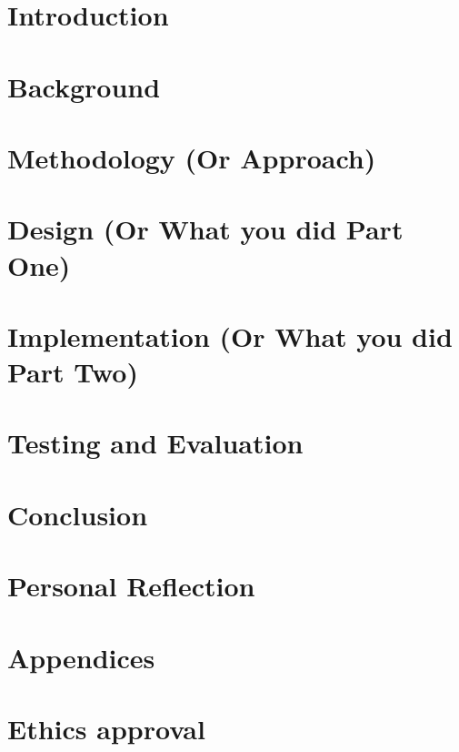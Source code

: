 \documentclass[12pt,twoside]{report}
\begin{document}






\tableofcontents

\listoffigures

\listoftables


\chapter{Introduction}


\chapter{Background}


\chapter{Methodology (Or Approach)}


\chapter{Design (Or What you did Part One)}


\chapter{Implementation (Or What you did Part Two)}


\chapter{Testing and Evaluation}


\chapter{Conclusion}



\appendix
\chapter{Personal Reflection }

\chapter{Appendices}

\chapter{Ethics approval}


\printbibliography
\end{document}
